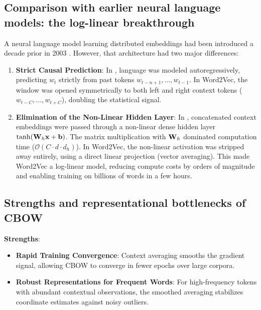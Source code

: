 \documentclass[../../main.tex]{subfiles}
\begin{document}
\subsection{Comparison with earlier neural language models: the log-linear breakthrough}
\label{subsec:bengio_vs_mikolov}

A neural language model learning distributed embeddings had been introduced a decade prior in 2003 \cite{bengio2003}. However, that architecture had two major differences:
\begin{enumerate}
    \item \textbf{Strict Causal Prediction}: In \cite{bengio2003}, language was modeled autoregressively, predicting $w_t$ strictly from past tokens $w_{t-n+1}, \dots, w_{t-1}$. In Word2Vec, the window was opened symmetrically to both left and right context tokens ($w_{t-C}, \dots, w_{t+C}$), doubling the statistical signal.
    \item \textbf{Elimination of the Non-Linear Hidden Layer}: In \cite{bengio2003}, concatenated context embeddings were passed through a non-linear dense hidden layer $\tanh(\mathbf{W}_h \mathbf{x} + \mathbf{b})$. The matrix multiplication with $\mathbf{W}_h$ dominated computation time ($\mathcal{O}(C \cdot d \cdot d_h)$). In Word2Vec, the non-linear activation was stripped away entirely, using a direct linear projection (vector averaging). This made Word2Vec a log-linear model, reducing compute costs by orders of magnitude and enabling training on billions of words in a few hours.
\end{enumerate}

\subsection{Strengths and representational bottlenecks of CBOW}
\label{subsec:cbow_bottlenecks}

\noindent\textbf{Strengths}:
\begin{itemize}
    \item \textbf{Rapid Training Convergence}: Context averaging smooths the gradient signal, allowing CBOW to converge in fewer epochs over large corpora.
    \item \textbf{Robust Representations for Frequent Words}: For high-frequency tokens with abundant contextual observations, the smoothed averaging stabilizes coordinate estimates against noisy outliers.
\end{itemize}
\end{document}
